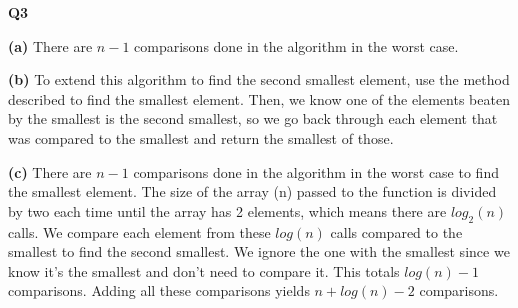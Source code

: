 \documentclass[fleqn]{article}
\begin{document}
\newpage
{\Large\bf Q3}\par
\textbf{(a)} There are $n-1$ comparisons done in the algorithm in the worst case.\par
\textbf{(b)} To extend this algorithm to find the second smallest element, use the method described to find the smallest element. Then, we know one of the elements beaten by the smallest is the second smallest, so we go back through each element that was compared to the smallest and return the smallest of those.\par
\textbf{(c)} There are $n-1$ comparisons done in the algorithm in the worst case to find the smallest element. The size of the array (n) passed to the function is divided by two each time until the array has 2 elements, which means there are $log_2(n)$ calls. We compare each element from these $log(n)$ calls compared to the smallest to find the second smallest. We ignore the one with the smallest since we know it's the smallest and don't need to compare it. This totals $log(n)-1$ comparisons. Adding all these comparisons yields $n+log(n)-2$ comparisons.
\end{document}
